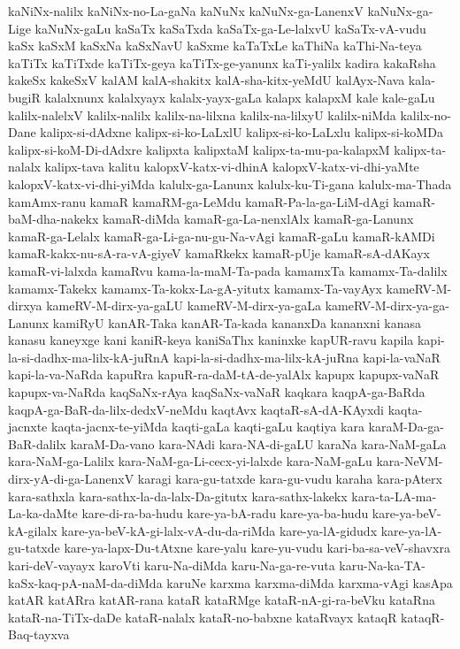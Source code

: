 {kaNiNx-nalilx
kaNiNx-no-La-gaNa
kaNuNx
kaNuNx-ga-LanenxV
kaNuNx-ga-Lige
kaNuNx-gaLu
kaSaTx
kaSaTxda
kaSaTx-ga-Le-lalxvU
kaSaTx-vA-vudu
kaSx
kaSxM
kaSxNa
kaSxNavU
kaSxme
kaTaTxLe
kaThiNa
kaThi-Na-teya
kaTiTx
kaTiTxde
kaTiTx-geya
kaTiTx-ge-yanunx
kaTi-yalilx
kadira
kakaRsha
kakeSx
kakeSxV
kalAM
kalA-shakitx
kalA-sha-kitx-yeMdU
kalAyx-Nava
kala-bugiR
kalalxnunx
kalalxyayx
kalalx-yayx-gaLa
kalapx
kalapxM
kale
kale-gaLu
kalilx-nalelxV
kalilx-nalilx
kalilx-na-lilxna
kalilx-na-lilxyU
kalilx-niMda
kalilx-no-Dane
kalipx-si-dAdxne
kalipx-si-ko-LaLxlU
kalipx-si-ko-LaLxlu
kalipx-si-koMDa
kalipx-si-koM-Di-dAdxre
kalipxta
kalipxtaM
kalipx-ta-mu-pa-kalapxM
kalipx-ta-nalalx
kalipx-tava
kalitu
kalopxV-katx-vi-dhinA
kalopxV-katx-vi-dhi-yaMte
kalopxV-katx-vi-dhi-yiMda
kalulx-ga-Lanunx
kalulx-ku-Ti-gana
kalulx-ma-Thada
kamAmx-ranu
kamaR
kamaRM-ga-LeMdu
kamaR-Pa-la-ga-LiM-dAgi
kamaR-baM-dha-nakekx
kamaR-diMda
kamaR-ga-La-nenxlAlx
kamaR-ga-Lanunx
kamaR-ga-Lelalx
kamaR-ga-Li-ga-nu-gu-Na-vAgi
kamaR-gaLu
kamaR-kAMDi
kamaR-kakx-nu-sA-ra-vA-giyeV
kamaRkekx
kamaR-pUje
kamaR-sA-dAKayx
kamaR-vi-lalxda
kamaRvu
kama-la-maM-Ta-pada
kamamxTa
kamamx-Ta-dalilx
kamamx-Takekx
kamamx-Ta-kokx-La-gA-yitutx
kamamx-Ta-vayAyx
kameRV-M-dirxya
kameRV-M-dirx-ya-gaLU
kameRV-M-dirx-ya-gaLa
kameRV-M-dirx-ya-ga-Lanunx
kamiRyU
kanAR-Taka
kanAR-Ta-kada
kananxDa
kananxni
kanasa
kanasu
kaneyxge
kani
kaniR-keya
kaniSaThx
kaninxke
kapUR-ravu
kapila
kapi-la-si-dadhx-ma-lilx-kA-juRnA
kapi-la-si-dadhx-ma-lilx-kA-juRna
kapi-la-vaNaR
kapi-la-va-NaRda
kapuRra
kapuR-ra-daM-tA-de-yalAlx
kapupx
kapupx-vaNaR
kapupx-va-NaRda
kaqSaNx-rAya
kaqSaNx-vaNaR
kaqkara
kaqpA-ga-BaRda
kaqpA-ga-BaR-da-lilx-dedxV-neMdu
kaqtAvx
kaqtaR-sA-dA-KAyxdi
kaqta-jacnxte
kaqta-jacnx-te-yiMda
kaqti-gaLa
kaqti-gaLu
kaqtiya
kara
karaM-Da-ga-BaR-dalilx
karaM-Da-vano
kara-NAdi
kara-NA-di-gaLU
karaNa
kara-NaM-gaLa
kara-NaM-ga-Lalilx
kara-NaM-ga-Li-cecx-yi-lalxde
kara-NaM-gaLu
kara-NeVM-dirx-yA-di-ga-LanenxV
karagi
kara-gu-tatxde
kara-gu-vudu
karaha
kara-pAterx
kara-sathxla
kara-sathx-la-da-lalx-Da-gitutx
kara-sathx-lakekx
kara-ta-LA-ma-La-ka-daMte
kare-di-ra-ba-hudu
kare-ya-bA-radu
kare-ya-ba-hudu
kare-ya-beV-kA-gilalx
kare-ya-beV-kA-gi-lalx-vA-du-da-riMda
kare-ya-lA-gidudx
kare-ya-lA-gu-tatxde
kare-ya-lapx-Du-tAtxne
kare-yalu
kare-yu-vudu
kari-ba-sa-veV-shavxra
kari-deV-vayayx
karoVti
karu-Na-diMda
karu-Na-ga-re-vuta
karu-Na-ka-TA-kaSx-kaq-pA-naM-da-diMda
karuNe
karxma
karxma-diMda
karxma-vAgi
kasApa
katAR
katARra
katAR-rana
kataR
kataRMge
kataR-nA-gi-ra-beVku
kataRna
kataR-na-TiTx-daDe
kataR-nalalx
kataR-no-babxne
kataRvayx
kataqR
kataqR-Baq-tayxva
}
